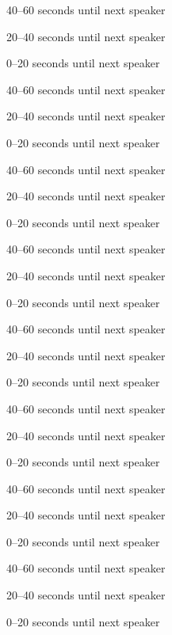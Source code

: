 \documentclass[landscape]{slides}
\newcommand{\lightning}[1]{
  
  \begin{slide}
    40--60 seconds until next speaker
  \end{slide}
  \begin{slide}
    20--40 seconds until next speaker
  \end{slide}
  \begin{slide}
    0--20 seconds until next speaker
  \end{slide}
}
\begin{document}
\lightning{1-romainLeDucRMontreal2018.pdf}
\lightning{2-sahir.pdf}
\lightning{3-Mathieu_Dupont-raster.pdf}
\lightning{4-ebr-rmtl.pdf}
\lightning{5-pokemon.pdf}
\lightning{6-Daigle.pdf}
\lightning{7-mondin.pdf}
\lightning{8-Sanger-populisme.pdf}
\end{document}
